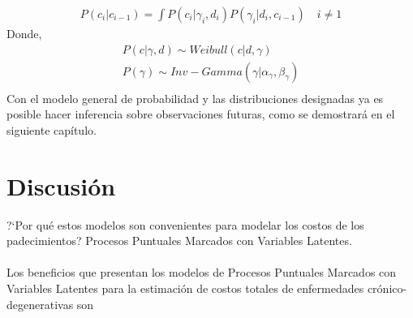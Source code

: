 \begin{align*}
P(c_i|c_{i-1})=\int P(c_i|\gamma_i,d_i)P(\gamma_i|d_i,c_{i-1}) \quad i \neq 1
\end{align*}
Donde,
\begin{align*}
P(c|\gamma,d) \sim Weibull(c|d,\gamma)\\
P(\gamma) \sim Inv-Gamma(\gamma|\alpha_\gamma,\beta_\gamma)\\
\end{align*}
Con el modelo general de probabilidad y las distribuciones designadas ya es posible hacer inferencia sobre observaciones futuras, como se demostrar\'a en el siguiente cap\'itulo.
\section{Discusi\'on}
?`Por qu\'e estos modelos son convenientes para modelar los costos de los padecimientos? Procesos Puntuales Marcados con Variables Latentes.\\
\\
Los beneficios que presentan los modelos de Procesos Puntuales Marcados con Variables Latentes para la estimaci\'on de costos totales de enfermedades cr\'onico-degenerativas son